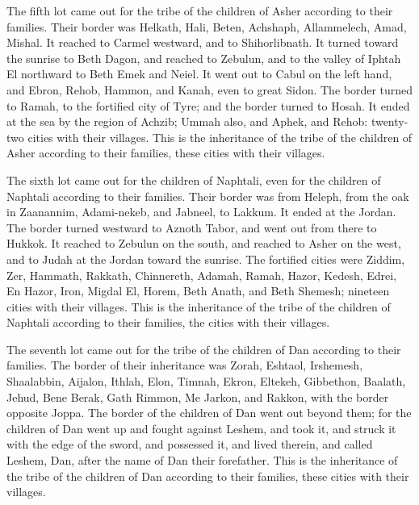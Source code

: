 The fifth lot came out for the tribe of the children of
Asher according to their families.  Their border was
Helkath, Hali, Beten, Achshaph,  Allammelech, Amad, Mishal.
It reached to Carmel westward, and to Shihorlibnath.  It
turned toward the sunrise to Beth Dagon, and reached to Zebulun, and to
the valley of Iphtah El northward to Beth Emek and Neiel. It went out to
Cabul on the left hand,  and Ebron, Rehob, Hammon, and
Kanah, even to great Sidon.  The border turned to Ramah, to
the fortified city of Tyre; and the border turned to Hosah. It ended at
the sea by the region of Achzib;  Ummah also, and Aphek,
and Rehob: twenty-two cities with their villages.  This is
the inheritance of the tribe of the children of Asher according to their
families, these cities with their villages.

 The sixth lot came out for the children of Naphtali, even
for the children of Naphtali according to their families. 
Their border was from Heleph, from the oak in Zaanannim, Adami-nekeb,
and Jabneel, to Lakkum. It ended at the Jordan.  The border
turned westward to Aznoth Tabor, and went out from there to Hukkok. It
reached to Zebulun on the south, and reached to Asher on the west, and
to Judah at the Jordan toward the sunrise.  The fortified
cities were Ziddim, Zer, Hammath, Rakkath, Chinnereth, 
Adamah, Ramah, Hazor,  Kedesh, Edrei, En Hazor,
 Iron, Migdal El, Horem, Beth Anath, and Beth Shemesh;
nineteen cities with their villages.  This is the
inheritance of the tribe of the children of Naphtali according to their
families, the cities with their villages.

 The seventh lot came out for the tribe of the children of
Dan according to their families.  The border of their
inheritance was Zorah, Eshtaol, Irshemesh,  Shaalabbin,
Aijalon, Ithlah,  Elon, Timnah, Ekron, 
Eltekeh, Gibbethon, Baalath,  Jehud, Bene Berak, Gath
Rimmon,  Me Jarkon, and Rakkon, with the border opposite
Joppa.  The border of the children of Dan went out beyond
them; for the children of Dan went up and fought against Leshem, and
took it, and struck it with the edge of the sword, and possessed it, and
lived therein, and called Leshem, Dan, after the name of Dan their
forefather.  This is the inheritance of the tribe of the
children of Dan according to their families, these cities with their
villages.

